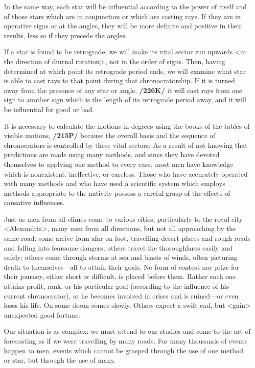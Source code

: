 In the same way, each star will be influential according to the power of itself and of those stars which are in conjunction or which are casting rays. If they are in operative signs or at the angles, they will be more definite and positive in their results, less so if they precede the angles. 

If a star is found to be retrograde, we will make its vital sector run upwards <in the direction of diurnal rotation>, not in the order
of signs. Then, having determined at which point its retrograde period ends, we will examine what star is able to cast rays to that point during that chronocratorship. If it is turned away from the presence of any star or angle, \textbf{/226K/} it will cast rays from one sign to another sign which is the length of its retrograde period away, and it will be influential for good or bad.

It is necessary to calculate the motions in degrees using the books of the tables of visible motions, \textbf{/215P/} because the overall basis and the sequence of chronocrators is controlled by these vital sectors. As a result of not knowing that predictions are made using many methods, and since they have devoted themselves to applying one method to every case, most men have knowledge which is nonexistent, ineffective, or careless. Those who have accurately operated with many methods and who have used a scientific system which employs methods appropriate to the nativity possess a careful grasp of the effects of causative influences. 

Just as men from all climes come to various cities, particularly to the royal city <Alexandria>, many men from all directions, but not all approaching by the same road: some arrive from afar on foot, travelling desert places and rough roads and falling into fearsome dangers; others travel the thoroughfares easily and safely; others come through storms at sea and blasts of winds, often picturing death
to themselves—all to attain their goals. No form of contest nor prize for their journey, either short or difficult, is placed before them. Rather each one attains profit, rank, or his particular goal (according to the
influence of his current chronocrator), or he becomes involved in crises and is ruined—or even loses his life. On some doom comes slowly. Others expect a swift end, but <gain> unexpected good fortune. 

Our situation is as complex: we must attend to our studies and come to the art of forecasting as if we were travelling by many roads. For many thousands of events happen to men, events which cannot be
grasped through the use of one method or star, but through the use of many. 

